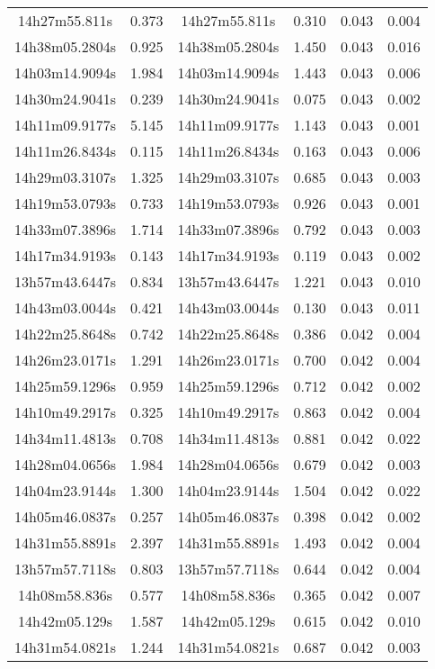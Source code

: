 \begin{table}
\begin{tabular}{cccccc}
14h27m55.811s & 0.373 & 14h27m55.811s & 0.310 & 0.043 & 0.004 \\
14h38m05.2804s & 0.925 & 14h38m05.2804s & 1.450 & 0.043 & 0.016 \\
14h03m14.9094s & 1.984 & 14h03m14.9094s & 1.443 & 0.043 & 0.006 \\
14h30m24.9041s & 0.239 & 14h30m24.9041s & 0.075 & 0.043 & 0.002 \\
14h11m09.9177s & 5.145 & 14h11m09.9177s & 1.143 & 0.043 & 0.001 \\
14h11m26.8434s & 0.115 & 14h11m26.8434s & 0.163 & 0.043 & 0.006 \\
14h29m03.3107s & 1.325 & 14h29m03.3107s & 0.685 & 0.043 & 0.003 \\
14h19m53.0793s & 0.733 & 14h19m53.0793s & 0.926 & 0.043 & 0.001 \\
14h33m07.3896s & 1.714 & 14h33m07.3896s & 0.792 & 0.043 & 0.003 \\
14h17m34.9193s & 0.143 & 14h17m34.9193s & 0.119 & 0.043 & 0.002 \\
13h57m43.6447s & 0.834 & 13h57m43.6447s & 1.221 & 0.043 & 0.010 \\
14h43m03.0044s & 0.421 & 14h43m03.0044s & 0.130 & 0.043 & 0.011 \\
14h22m25.8648s & 0.742 & 14h22m25.8648s & 0.386 & 0.042 & 0.004 \\
14h26m23.0171s & 1.291 & 14h26m23.0171s & 0.700 & 0.042 & 0.004 \\
14h25m59.1296s & 0.959 & 14h25m59.1296s & 0.712 & 0.042 & 0.002 \\
14h10m49.2917s & 0.325 & 14h10m49.2917s & 0.863 & 0.042 & 0.004 \\
14h34m11.4813s & 0.708 & 14h34m11.4813s & 0.881 & 0.042 & 0.022 \\
14h28m04.0656s & 1.984 & 14h28m04.0656s & 0.679 & 0.042 & 0.003 \\
14h04m23.9144s & 1.300 & 14h04m23.9144s & 1.504 & 0.042 & 0.022 \\
14h05m46.0837s & 0.257 & 14h05m46.0837s & 0.398 & 0.042 & 0.002 \\
14h31m55.8891s & 2.397 & 14h31m55.8891s & 1.493 & 0.042 & 0.004 \\
13h57m57.7118s & 0.803 & 13h57m57.7118s & 0.644 & 0.042 & 0.004 \\
14h08m58.836s & 0.577 & 14h08m58.836s & 0.365 & 0.042 & 0.007 \\
14h42m05.129s & 1.587 & 14h42m05.129s & 0.615 & 0.042 & 0.010 \\
14h31m54.0821s & 1.244 & 14h31m54.0821s & 0.687 & 0.042 & 0.003 \\

\end{tabular}
\end{table}
